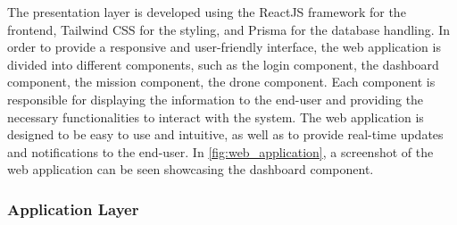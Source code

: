 The presentation layer is developed using the ReactJS framework \autocite{reactReact} for the frontend, Tailwind CSS \autocite{tailwindcssTailwindRapidly} for the styling, and Prisma \autocite{prismaPrismaSimplify} for the database handling. In order to provide a responsive and user-friendly interface, the web application is divided into different components, such as the login component, the dashboard component, the mission component, the drone component. Each component is responsible for displaying the information to the end-user and providing the necessary functionalities to interact with the system. The web application is designed to be easy to use and intuitive, as well as to provide real-time updates and notifications to the end-user. In \cref{fig:web_application}, a screenshot of the web application can be seen showcasing the dashboard component.




\subsubsection{Application Layer}\label{subsubsec:implementation_application_layer}

